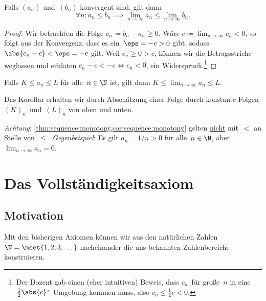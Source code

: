 \documentclass[a4paper]{article}
\begin{document}
\begin{theorem}\label{thm:sequence:monotony}
    Falls $(a_n)$ und~$(b_n)$ konvergent sind, gilt dann
    \begin{equation*}
        \forall n\colon a_n \leq b_n \implies \lim_{n\to\infty} a_n \leq \lim_{n\to\infty} b_n.
    \end{equation*}
\end{theorem}

\begin{proof}
    Wir betrachten die Folge $c_n \coloneqq b_n - a_n \geq 0$. Wäre $c \coloneqq \lim_{n\to\infty} c_n < 0$, so folgt aus der Konvergenz, dass es ein~$\eps = -c > 0$ gibt, sodass $\abs{c_n-c} < \eps = -c$ gilt. Weil $c_n \geq 0 > c$, können wir die Betragsstriche weglassen und erhlaten $c_n-c < -c \iff c_n < 0$, ein Widerspruch.\footnote{Der Dozent gab einen (eher intuitiven) Beweis, dass $c_n$~für große~$n$ in eine $\frac{1}{2}\abs{c}$"~Umgebung kommen muss, also $c_n \leq \frac{1}{2}c < 0$.}
\end{proof}

\begin{corollary}\label{cor:sequence:monotony}
    Falls $K \leq a_n \leq L$ für alle~$n \in \N$ ist, gilt dann $K \leq \lim_{n\to\infty} a_n \leq L$.
\end{corollary}

Das Korollar erhalten wir durch Abschätzung einer Folge durch konstante Folgen $(K)_n$~und~$(L)_n$ von oben und unten.

\emph{Achtung}: \cref{thm:sequence:monotony,cor:sequence:monotony} gelten \underline{nicht} mit~$<$ an Stelle von~$\leq$. \emph{Gegenbeispiel}: Es gilt $a_n = 1/n > 0$ für alle~$n \in \N$, aber $\lim_{n\to\infty} a_n = 0$.


\section{Das Vollständigkeitsaxiom}

\subsection{Motivation}

Mit den bisherigen Axiomen können wir aus den natürlichen Zahlen~$\N = \mset{1, 2, 3, \dots}$ nacheinander die uns bekannten Zahlenbereiche konstruieren.
\end{document}
